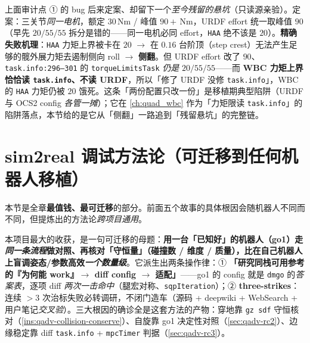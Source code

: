 \begin{pitfall}\label{pit:qadv-torque-task-vs-urdf}
上面审计点 ① 的 bug 后来定案、却留下一个\emph{至今残留的悬坑}（只读源亲验）。定案：三关节\emph{同一电机}，额定 $30$\,Nm / 峰值 $90+$\,Nm，URDF effort 统一取峰值 \textbf{$90$}（早先 $20/55/55$ 拆分是错的——同一电机必同 effort，\texttt{HAA} 绝不该是 $20$）。\textbf{精确失败机理}：\texttt{HAA} 力矩上界被卡在 $20$ $\to$ 在 $0.16$ 台阶顶（step crest）无法产生足够的髋外展力矩去遏制侧向 roll $\to$ \textbf{侧翻}。但 URDF effort 改了 $90$、\texttt{task.info:296--301} 的 \texttt{torqueLimitsTask} \emph{仍是} $20/55/55$——而 \textbf{WBC 力矩上界恰恰读 \texttt{task.info}、不读 URDF}，所以「修了 URDF 没修 \texttt{task.info}」，WBC 的 \texttt{HAA} 力矩仍被 $20$ 饿死。这条「两份配置只改一份」是移植期典型陷阱（URDF 与 OCS2 config \emph{各管一摊}）；它在 \cref{ch:quad_wbc} 作为「力矩限读 \texttt{task.info}」的陷阱落点，本节给的是它从「侧翻」一路追到「残留悬坑」的完整链。
\end{pitfall}

\section{sim2real 调试方法论（可迁移到任何机器人移植）}
\label{sec:qadv-method}

本节是全章\textbf{最值钱、最可迁移}的部分。前面五个故事的具体根因会随机器人不同而不同，但提炼出的方法论\emph{跨项目通用}。

\begin{insight}\label{ins:qadv-method-core}
本项目最大的收获，是一句可迁移的母题：\textbf{用一台「已知好」的机器人（go1）走\emph{同一条流程}做对照、再核对「守恒量」（碰撞数 / 维度 / 质量），比在自己机器人上盲调姿态/参数高效\emph{一个数量级}}。它派生出两条操作律：① \textbf{「研究同栈可用参考的『为何能 work』$\to$ diff config $\to$ 适配」}——go1 的 config 就是 \texttt{dmgo} 的\emph{答案表}，逐项 diff \emph{两次一击命中}（腿宏对称、\texttt{sqpIteration}）；② \textbf{three-strikes}：连续 $>3$ 次治标失败必转调研，不闭门造车（源码 + deepwiki + WebSearch + 用户笔记\emph{交叉验}）。三大根因的确诊全是这套方法的产物：穿地靠 \texttt{gz sdf} 守恒核对（\cref{ins:qadv-collision-conserve}）、自旋靠 go1 决定性对照（\cref{sec:qadv-rc2}）、边缘稳定靠 diff \texttt{task.info} + \texttt{mpcTimer} 判据（\cref{sec:qadv-rc3}）。
\end{insight}

